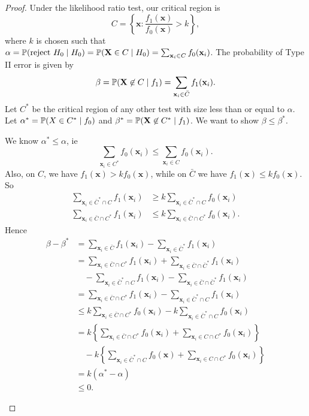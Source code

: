 \documentclass[a4paper]{article}
\begin{document}
\begin{proof}
	Under the likelihood ratio test, our critical region is
	\[
	C = \left\{\mathbf{x}: \frac{f_1(\mathbf{x})}{f_0(\mathbf{x})} > k\right\},
	\]
	where $k$ is chosen such that $\alpha=\P(\text{reject }H_0\mid H_0) = \P(\mathbf{X}\in C\mid H_0) = \sum_{\mathbf{x}_{i} \in C} f_0(\mathbf{x}_{i})$. The probability of Type II error is given by
	\[
	\beta = \P(\mathbf{X}\not\in C\mid f_1) = \sum_{\mathbf{x}_{i} \in \bar{C}} f_1(\mathbf{x}_{i}).
	\]
	Let $C^*$ be the critical region of any other test with size less than or equal to $\alpha$. Let $\alpha^* = \P(X\in C^*\mid f_0)$ and $\beta^* = \P(\mathbf{X}\not\in C^*\mid f_1)$. We want to show $\beta \leq \beta^*$.
	
	We know $\alpha^* \leq \alpha$, ie
	\[
	\sum_{\mathbf{x}_{i} \in C^{*}} f_0(\mathbf{x}_{i})\leq \sum_{\mathbf{x}_{i} \in C} f_0(\mathbf{x}_{i}).
	\]
	Also, on $C$, we have $f_1(\mathbf{x}) > kf_0(\mathbf{x})$, while on $\bar C$ we have $f_1(\mathbf{x}) \leq kf_0(\mathbf{x})$. So
	\begin{align*}
	\sum_{\mathbf{x}_{i} \in \bar C^*\cap C} f_1(\mathbf{x}_{i}) &\geq k\sum_{\mathbf{x}_{i} \in \bar C^*\cap C} f_0(\mathbf{x}_{i}) \\
	\sum_{\mathbf{x}_{i} \in \bar C\cap C^*}  f_1(\mathbf{x}_{i}) &\leq k 	\sum_{\mathbf{x}_{i} \in \bar C\cap C^*} f_0 (\mathbf{x}_{i}).
	\end{align*}
	Hence
	\begin{align*}
	\beta - \beta^* &= \sum_{\mathbf{x}_i \in \bar C}f_1(\mathbf{x}_{i})  - \sum_{\mathbf{x}_i \in \bar C^*}f_1(\mathbf{x}_{i})\\
	&= \sum_{\mathbf{x}_i \in \bar C\cap C^*} f_1(\mathbf{x}_{i}) + \sum_{\mathbf{x}_i \in \bar C\cap \bar C^*}f_1(\mathbf{x}_{i}) \\
	&\quad - \sum_{\mathbf{x}_i \in \bar C^*\cap C} f_1(\mathbf{x}_{i}) - \sum_{ \mathbf{x}_i \in \bar C\cap \bar C^*}f_1(\mathbf{x}_{i})\\
	&= \sum_{\mathbf{x}_i \in \bar C \cap C^*}f_1(\mathbf{x}_{i})  - \sum_{\mathbf{x}_i \in \bar C^*\cap C}f_1(\mathbf{x}_{i}) \\
	&\leq k\sum_{\mathbf{x}_i \in \bar C \cap C^*} f_0(\mathbf{x}_{i})  - k\sum_{\mathbf{x}_i \in \bar C^*\cap C}f_0(\mathbf{x}_{i}) \\
	&= k \left\{\sum_{\mathbf{x}_i \in \bar C\cap C^*}f_0(\mathbf{x}_{i})+ \sum_{\mathbf{x}_i \in C \cap C^*}f_0(\mathbf{x}_{i}) \right\} \\
	&\quad- k\left\{\sum_{\mathbf{x}_i \in \bar C^*\cap C}f_0(\mathbf{x}) + \sum_{\mathbf{x}_i \in C\cap C^*}f_0(\mathbf{x}_{i})\right\}\\
	&= k(\alpha^* - \alpha)\\
	&\leq 0.
	\end{align*}
	\begin{center}
\end{center}
\end{proof}
\end{document}
